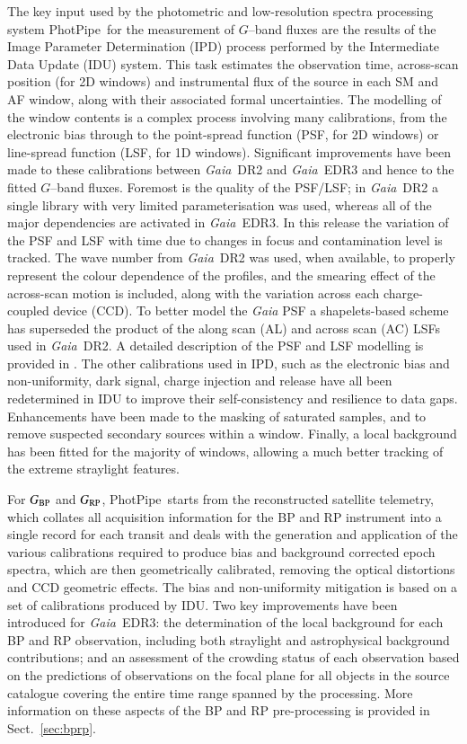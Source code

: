 \documentclass{aa}
\newcommand{\gaia}{\textit{Gaia}\xspace}
\newcommand{\gband}{$G$--band\xspace}
\newcommand{\gbp}{\ensuremath{G_{\rm BP}}\xspace}
\newcommand{\grp}{\ensuremath{G_{\rm RP}}\xspace}
\newcommand{\PP}{\textsf{PhotPipe}}
\newcommand{\drt}{\gaia~DR2\xspace}
\newcommand{\edr}{\gaia~EDR3\xspace}
\newcommand{\xp}{BP and RP\xspace}
\newcommand{\secname}{Sect.}
\newcommand{\secref}[1]{\secname~\ref{sec:#1}}
\begin{document}
The key input used by the photometric and low-resolution spectra processing system \PP\ for the measurement of \gband fluxes are the results of the Image Parameter Determination (IPD) process performed by the Intermediate Data Update (IDU) system. This task estimates the observation time, across-scan position (for 2D windows) and instrumental flux of the source in each SM and AF window, along with their associated formal uncertainties. The modelling of the window contents is a complex process involving many calibrations, from the electronic bias through to the point-spread function (PSF, for 2D windows) or line-spread function (LSF, for 1D windows). Significant improvements have been made to these calibrations between \drt and \edr and hence to the fitted \gband fluxes. Foremost is the quality of the PSF/LSF; in \drt a single library with very limited parameterisation was used, whereas all of the major dependencies are activated in \edr. In this release the variation of the PSF and LSF with time due to changes in focus and contamination level is tracked. The wave number from \drt was used, when available, to properly represent the colour dependence of the profiles, and the smearing effect of the across-scan motion is included, along with the variation across each charge-coupled device (CCD). To better model the \gaia PSF a shapelets-based scheme has superseded the product of the along scan (AL) and across scan (AC) LSFs used in \drt. A detailed description of the PSF and LSF modelling is provided in \cite{EDR3_PSF}. The other calibrations used in IPD, such as the electronic bias and non-uniformity, dark signal, charge injection and release \citep{BIAS} have all been redetermined in IDU to improve their self-consistency and resilience to data gaps. Enhancements have been made to the masking of saturated samples, and to remove suspected secondary sources within a window. Finally, a local background has been fitted for the majority of windows, allowing a much better tracking of the extreme straylight features.

For \gbp and \grp, \PP\ starts from the reconstructed satellite telemetry, which collates all acquisition information for the \xp instrument into a single record for each transit and deals with the generation and application of the various calibrations required to produce bias and background corrected epoch spectra, which are then geometrically calibrated, removing the optical distortions and CCD geometric effects. The bias and non-uniformity mitigation \citep{BIAS} is based on a set of calibrations produced by IDU. Two key improvements have been introduced for \edr: the determination of the local background for each \xp observation, including both straylight and astrophysical background contributions; and an assessment of the crowding status of each observation based on the predictions of observations on the focal plane for all objects in the source catalogue covering the entire time range spanned by the processing. More information on these aspects of the \xp pre-processing is provided in \secref{bprp}.
\end{document}
